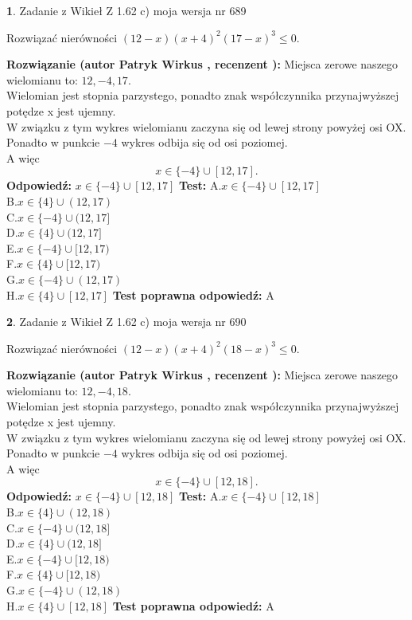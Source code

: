 \documentclass[12pt, a4paper]{article}
\theoremstyle{definition} %
\newtheorem{zad}{}
\newcommand{\zadStart}[1]{\begin{zad}#1\newline}
\newcommand{\zadStop}{\end{zad}}
\newcommand{\rozwStart}[2]{\noindent \textbf{Rozwiązanie (autor #1 , recenzent #2): }\newline}
\newcommand{\rozwStop}{\newline}
\newcommand{\odpStart}{\noindent \textbf{Odpowiedź:}\newline}
\newcommand{\odpStop}{\newline}
\newcommand{\testStart}{\noindent \textbf{Test:}\newline}
\newcommand{\testStop}{\newline}
\newcommand{\kluczStart}{\noindent \textbf{Test poprawna odpowiedź:}\newline}
\newcommand{\kluczStop}{\newline}
\begin{document}
\zadStart{Zadanie z Wikieł Z 1.62 c) moja wersja nr 689}

Rozwiązać nierówności $(12-x)(x+4)^{2}(17-x)^{3}\le0$.
\zadStop
\rozwStart{Patryk Wirkus}{}
Miejsca zerowe naszego wielomianu to: $12, -4, 17$.\\
Wielomian jest stopnia parzystego, ponadto znak współczynnika przy\linebreak najwyższej potędze x jest ujemny.\\ W związku z tym wykres wielomianu zaczyna się od lewej strony powyżej osi OX.\\
Ponadto w punkcie $-4$ wykres odbija się od osi poziomej.\\
A więc $$x \in \{-4\} \cup [12,17].$$
\rozwStop
\odpStart
$x \in \{-4\} \cup [12,17]$
\odpStop
\testStart
A.$x \in \{-4\} \cup [12,17]$\\
B.$x \in \{4\} \cup (12,17)$\\
C.$x \in \{-4\} \cup (12,17]$\\
D.$x \in \{4\} \cup (12,17]$\\
E.$x \in \{-4\} \cup [12,17)$\\
F.$x \in \{4\} \cup [12,17)$\\
G.$x \in \{-4\} \cup (12,17)$\\
H.$x \in \{4\} \cup [12,17]$
\testStop
\kluczStart
A
\kluczStop



\zadStart{Zadanie z Wikieł Z 1.62 c) moja wersja nr 690}

Rozwiązać nierówności $(12-x)(x+4)^{2}(18-x)^{3}\le0$.
\zadStop
\rozwStart{Patryk Wirkus}{}
Miejsca zerowe naszego wielomianu to: $12, -4, 18$.\\
Wielomian jest stopnia parzystego, ponadto znak współczynnika przy\linebreak najwyższej potędze x jest ujemny.\\ W związku z tym wykres wielomianu zaczyna się od lewej strony powyżej osi OX.\\
Ponadto w punkcie $-4$ wykres odbija się od osi poziomej.\\
A więc $$x \in \{-4\} \cup [12,18].$$
\rozwStop
\odpStart
$x \in \{-4\} \cup [12,18]$
\odpStop
\testStart
A.$x \in \{-4\} \cup [12,18]$\\
B.$x \in \{4\} \cup (12,18)$\\
C.$x \in \{-4\} \cup (12,18]$\\
D.$x \in \{4\} \cup (12,18]$\\
E.$x \in \{-4\} \cup [12,18)$\\
F.$x \in \{4\} \cup [12,18)$\\
G.$x \in \{-4\} \cup (12,18)$\\
H.$x \in \{4\} \cup [12,18]$
\testStop
\kluczStart
A
\kluczStop
\end{document}
